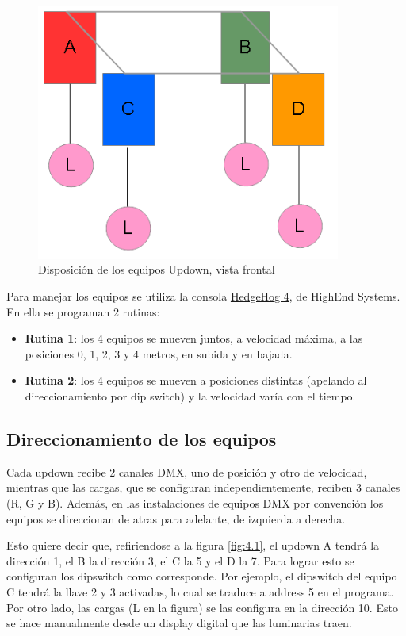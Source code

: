 \begin{figure}[!ht]
	\centering
	\includegraphics[width=10cm,scale=1]{resources/4_1-disposicionUpdowns.png}
	\caption{Disposición de los equipos Updown, vista frontal}
	\label{fig:\thefigure}
\end{figure}

Para manejar los equipos se utiliza la consola \href{http://www.lighttrader.com/images/HI61020007_L.JPG}{HedgeHog 4}, de HighEnd Systems. En ella se programan 2 rutinas:
\begin{itemize}
	\item \textbf{Rutina 1}: los 4 equipos se mueven juntos, a velocidad máxima, a las posiciones 0, 1, 2, 3 y 4 metros, en subida y en bajada.
	\item \textbf{Rutina 2}: los 4 equipos se mueven a posiciones distintas (apelando al direccionamiento por dip switch) y la velocidad varía con el tiempo.
\end{itemize}

\subsection{Direccionamiento de los equipos}
Cada updown recibe 2 canales DMX, uno de posición y otro de velocidad, mientras que las cargas, que se configuran independientemente, reciben 3 canales (R, G y B). Además, en las instalaciones de equipos DMX por convención los equipos se direccionan de atras para adelante, de izquierda a derecha.

Esto quiere decir que, refiriendose a la figura \ref{fig:4.1}, el updown A tendrá la dirección 1, el B la dirección 3, el C la 5 y el D la 7. Para lograr esto se configuran los dipswitch como corresponde. Por ejemplo, el dipswitch del equipo C tendrá la llave 2 y 3 activadas, lo cual se traduce a address 5 en el programa.\\
Por otro lado, las cargas (L en la figura) se las configura en la dirección 10. Esto se hace manualmente desde un display digital que las luminarias traen. 

